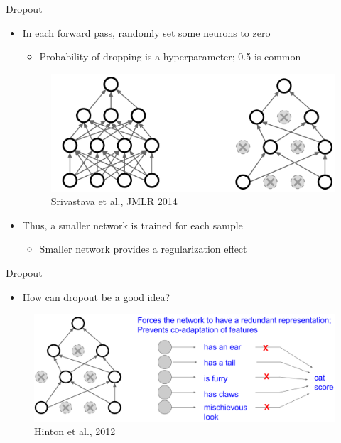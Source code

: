 \documentclass[serif, aspectratio=169]{beamer}
\begin{document}
\begin{frame}{Dropout}
	\begin{itemize}
		\item In each forward pass, randomly set some neurons to zero
		\begin{itemize}
			\item Probability of dropping is a hyperparameter; 0.5 is common
		\end{itemize}
		\begin{figure}[htpb]
			\begin{center}
				\includegraphics[keepaspectratio, scale=0.15]{pic/dropout}
				\caption*{\scriptsize Srivastava et al., JMLR 2014}
			\end{center}
		\end{figure}
		\vspace{-1em}
		\item Thus, a smaller network is trained for each sample
		\begin{itemize}
			\item Smaller network provides a regularization effect
		\end{itemize}
	\end{itemize}
\end{frame}

\begin{frame}{Dropout}
	\begin{itemize}
		\item How can dropout be a good idea?
	\end{itemize}
	\begin{figure}[htpb]
		\begin{center}
			\includegraphics[keepaspectratio, scale=0.15]{pic/dropout2}
			\caption*{\scriptsize Hinton et al., 2012}
		\end{center}
	\end{figure}
\end{frame}
\end{document}
